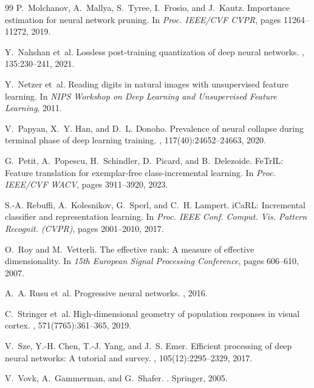 \documentclass{article}
\begin{document}
\begin{thebibliography}{99}
P.~Molchanov, A.~Mallya, S.~Tyree, I.~Frosio, and J.~Kautz.
\newblock Importance estimation for neural network pruning.
\newblock In {\em Proc. IEEE/CVF CVPR}, pages 11264--11272, 2019.

Y.~Nahshan et~al.
\newblock Lossless post-training quantization of deep neural networks.
, 135:230--241, 2021.

Y.~Netzer et~al.
\newblock Reading digits in natural images with unsupervised feature learning.
\newblock In {\em NIPS Workshop on Deep Learning and Unsupervised Feature Learning}, 2011.

V.~Papyan, X.~Y. Han, and D.~L. Donoho.
\newblock Prevalence of neural collapse during terminal phase of deep learning training.
, 117(40):24652--24663, 2020.

G.~Petit, A.~Popescu, H.~Schindler, D.~Picard, and B.~Delezoide.
\newblock Fe{T}r{IL}: Feature translation for exemplar-free class-incremental learning.
\newblock In {\em Proc. IEEE/CVF WACV}, pages 3911--3920, 2023.


S.-A. Rebuffi, A.~Kolesnikov, G.~Sperl, and C.~H. Lampert.
\newblock i{C}a{RL}: Incremental classifier and representation learning.
\newblock In {\em Proc. IEEE Conf. Comput. Vis. Pattern Recognit. (CVPR)}, pages 2001--2010, 2017.

O.~Roy and M.~Vetterli.
\newblock The effective rank: A measure of effective dimensionality.
\newblock In {\em 15th European Signal Processing Conference}, pages 606--610, 2007.

A.~A. Rusu et~al.
\newblock Progressive neural networks.
, 2016.

C.~Stringer et~al.
\newblock High-dimensional geometry of population responses in visual cortex.
, 571(7765):361--365, 2019.

V.~Sze, Y.-H. Chen, T.-J. Yang, and J.~S. Emer.
\newblock Efficient processing of deep neural networks: A tutorial and survey.
, 105(12):2295--2329, 2017.

V.~Vovk, A.~Gammerman, and G.~Shafer.
.
\newblock Springer, 2005.


\end{thebibliography}
\end{document}
